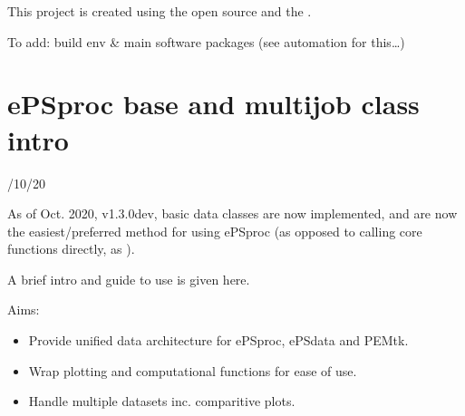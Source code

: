 \documentclass[letterpaper,10pt,english]{jupyterBook}
\begin{document}
\begin{DUlineblock}{0em}
\item[] 
\end{DUlineblock}

\sphinxAtStartPar
This project is created using the open source  and the .

\sphinxAtStartPar
To add: build env \& main software packages (see automation for this…)

\sphinxAtStartPar
{}


\chapter{ePSproc base and multijob class intro}
\label{\detokenize{testChpt/ePSproc_class_demo_161020:epsproc-base-and-multijob-class-intro}}\label{\detokenize{testChpt/ePSproc_class_demo_161020::doc}}
/10/20

\sphinxAtStartPar
As of Oct. 2020, v1.3.0\sphinxhyphen{}dev, basic data classes are now implemented, and are now the easiest/preferred method for using ePSproc (as opposed to calling core functions directly, as ).

\sphinxAtStartPar
A brief intro and guide to use is given here.

\sphinxAtStartPar
Aims:
\begin{itemize}
\item {} 
\sphinxAtStartPar
Provide unified data architecture for ePSproc, ePSdata and PEMtk.

\item {} 
\sphinxAtStartPar
Wrap plotting and computational functions for ease of use.

\item {} 
\sphinxAtStartPar
Handle multiple datasets inc. comparitive plots.

\end{itemize}
\end{document}
